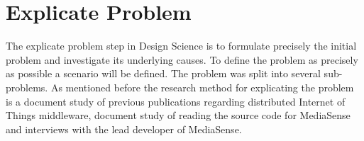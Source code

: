 \chapter{Explicate Problem}
The explicate problem step in Design Science \cite{johannesson2012design} is to formulate precisely the initial problem and investigate its underlying causes. To define the problem as precisely as possible a scenario will be defined. The problem was split into several sub-problems. As mentioned before the research method for explicating the problem is a document study of previous publications regarding distributed Internet of Things middleware, document study of reading the source code for MediaSense and interviews with the lead developer of MediaSense. 

%
%

